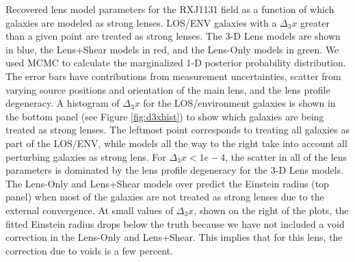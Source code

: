 \label{fig:RXJ1131} Recovered lens model parameters for the RXJ1131 field as a function of which galaxies are modeled as strong lenses. LOS/ENV galaxies with a $\Delta_3 x$ greater than a given point are treated as strong lenses. The 3-D Lens models are shown in blue, the Lens+Shear models in red, and the Lens-Only models in green. We used MCMC to calculate the marginalized 1-D posterior probability distribution. The error bars have contributions from measurement uncertainties, scatter from varying source positions and orientation of the main lens, and the lens profile degeneracy. A histogram of $\Delta_3 x$ for the LOS/environment galaxies is shown in the bottom panel (see Figure \ref{fig:d3xhist}) to show which galaxies are being treated as strong lenses. The leftmost point corresponds to treating all galaxies as part of the LOS/ENV, while models all the way to the right take into account all perturbing galaxies as strong lens. For $\Delta_3 x < 1e-4$, the scatter in all of the lens parameters is dominated by the lens profile degeneracy for the 3-D Lens models. The Lens-Only and Lens+Shear models over predict the Einstein radius (top panel) when most of the galaxies are not treated as strong lenses due to the external convergence. At small values of $\Delta_3 x$, shown on the right of the plots, the fitted Einstein radius drops below the truth because we have not included a void correction in the Lens-Only and Lens+Shear. This implies that for this lens, the correction due to voids is a few percent.